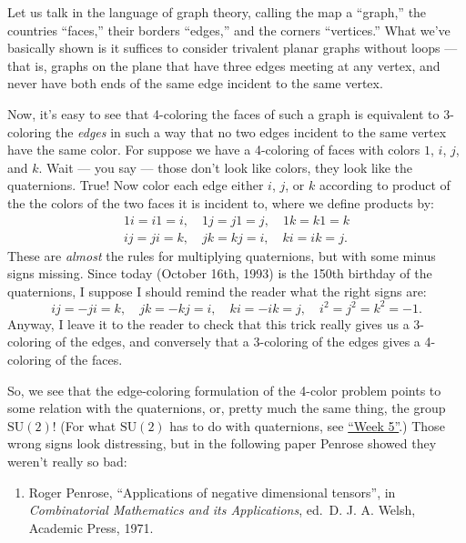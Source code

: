 \documentclass{article}
\def\tightlist{}
\begin{document}
Let us talk in the language of graph theory, calling the map a
``graph,'' the countries ``faces,'' their borders ``edges,'' and the
corners ``vertices.'' What we've basically shown is it suffices to
consider trivalent planar graphs without loops --- that is, graphs on
the plane that have three edges meeting at any vertex, and never have
both ends of the same edge incident to the same vertex.

Now, it's easy to see that 4-coloring the faces of such a graph is
equivalent to 3-coloring the \emph{edges} in such a way that no two
edges incident to the same vertex have the same color. For suppose we
have a 4-coloring of faces with colors \(1\), \(i\), \(j\), and \(k\).
Wait --- you say --- those don't look like colors, they look like the
quaternions. True! Now color each edge either \(i\), \(j\), or \(k\)
according to product of the the colors of the two faces it is incident
to, where we define products by:
\[\begin{gathered}1i = i1 = i, \quad 1j = j1 = j, \quad 1k = k1 = k \\ ij = ji = k, \quad jk = kj = i, \quad ki = ik = j.\end{gathered}\]
These are \emph{almost} the rules for multiplying quaternions, but with
some minus signs missing. Since today (October 16th, 1993) is the 150th
birthday of the quaternions, I suppose I should remind the reader what
the right signs are:
\[ij = -ji = k, \quad jk = -kj = i, \quad  ki = -ik = j, \quad i^2 = j^2 = k^2 = -1.\]
Anyway, I leave it to the reader to check that this trick really gives
us a 3-coloring of the edges, and conversely that a 3-coloring of the
edges gives a 4-coloring of the faces.

So, we see that the edge-coloring formulation of the 4-color problem
points to some relation with the quaternions, or, pretty much the same
thing, the group \(\mathrm{SU}(2)\)! (For what \(\mathrm{SU}(2)\) has to
do with quaternions, see \protect\hyperlink{week5}{``Week 5''}.) Those
wrong signs look distressing, but in the following paper Penrose showed
they weren't really so bad:

\begin{enumerate}
\def\labelenumi{\arabic{enumi})}
\setcounter{enumi}{3}
\tightlist
\item
   Roger Penrose, ``Applications of negative dimensional tensors'', in
  \emph{Combinatorial Mathematics and its Applications}, ed.~D. J. A.
  Welsh, Academic Press, 1971.
\end{enumerate}
\end{document}

